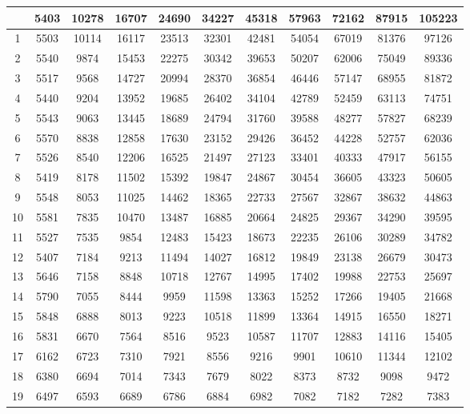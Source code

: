 \begin{longtable}[H]{|c|c|c|c|c|c|c|c|c|c|c|}
{        0 & 5403 & 10278 & 16707 & 24690 & 34227 & 45318 & 57963 & 72162 & 87915 & 105223  \\ \hline
        1 & 5503 & 10114 & 16117 & 23513 & 32301 & 42481 & 54054 & 67019 & 81376 & 97126  \\ \hline
        2 & 5540 & 9874 & 15453 & 22275 & 30342 & 39653 & 50207 & 62006 & 75049 & 89336  \\ \hline
        3 & 5517 & 9568 & 14727 & 20994 & 28370 & 36854 & 46446 & 57147 & 68955 & 81872  \\ \hline
        4 & 5440 & 9204 & 13952 & 19685 & 26402 & 34104 & 42789 & 52459 & 63113 & 74751  \\ \hline
        5 & 5543 & 9063 & 13445 & 18689 & 24794 & 31760 & 39588 & 48277 & 57827 & 68239  \\ \hline
        6 & 5570 & 8838 & 12858 & 17630 & 23152 & 29426 & 36452 & 44228 & 52757 & 62036  \\ \hline
        7 & 5526 & 8540 & 12206 & 16525 & 21497 & 27123 & 33401 & 40333 & 47917 & 56155  \\ \hline
        8 & 5419 & 8178 & 11502 & 15392 & 19847 & 24867 & 30454 & 36605 & 43323 & 50605  \\ \hline
        9 & 5548 & 8053 & 11025 & 14462 & 18365 & 22733 & 27567 & 32867 & 38632 & 44863  \\ \hline
        10 & 5581 & 7835 & 10470 & 13487 & 16885 & 20664 & 24825 & 29367 & 34290 & 39595  \\ \hline
        11 & 5527 & 7535 & 9854 & 12483 & 15423 & 18673 & 22235 & 26106 & 30289 & 34782  \\ \hline
        12 & 5407 & 7184 & 9213 & 11494 & 14027 & 16812 & 19849 & 23138 & 26679 & 30473  \\ \hline
        13 & 5646 & 7158 & 8848 & 10718 & 12767 & 14995 & 17402 & 19988 & 22753 & 25697  \\ \hline
        14 & 5790 & 7055 & 8444 & 9959 & 11598 & 13363 & 15252 & 17266 & 19405 & 21668  \\ \hline
        15 & 5848 & 6888 & 8013 & 9223 & 10518 & 11899 & 13364 & 14915 & 16550 & 18271  \\ \hline
        16 & 5831 & 6670 & 7564 & 8516 & 9523 & 10587 & 11707 & 12883 & 14116 & 15405  \\ \hline
        17 & 6162 & 6723 & 7310 & 7921 & 8556 & 9216 & 9901 & 10610 & 11344 & 12102  \\ \hline
        18 & 6380 & 6694 & 7014 & 7343 & 7679 & 8022 & 8373 & 8732 & 9098 & 9472  \\ \hline
        19  & 6497 & 6593 & 6689 & 6786 & 6884 & 6982 & 7082 & 7182 & 7282 & 7383 \\ \hline
    \end{longtable}
    

